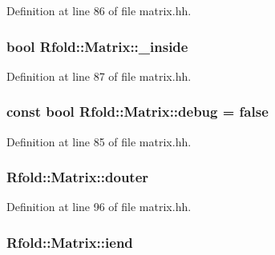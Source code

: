 Definition at line 86 of file matrix.\+hh.

\hypertarget{class_rfold_1_1_matrix_ab5046ea9c3952f87a52002fa583d1e1b}{
\subsubsection[{\+\_\+inside}]{\setlength{\rightskip}{0pt plus 5cm}bool Rfold\+::\+Matrix\+::\+\_\+inside}}\label{class_rfold_1_1_matrix_ab5046ea9c3952f87a52002fa583d1e1b}


Definition at line 87 of file matrix.\+hh.

\hypertarget{class_rfold_1_1_matrix_ad9a9131f0d234138b757dbe76fe62b28}{
\subsubsection[{debug}]{\setlength{\rightskip}{0pt plus 5cm}const bool Rfold\+::\+Matrix\+::debug = false\hspace{0.3cm}{\ttfamily [static]}}}\label{class_rfold_1_1_matrix_ad9a9131f0d234138b757dbe76fe62b28}


Definition at line 85 of file matrix.\+hh.

\hypertarget{class_rfold_1_1_matrix_a95f02edbb0a09ccd75a47f3baf50d1fe}{
\subsubsection[{douter}]{ Rfold\+::\+Matrix\+::douter}}\label{class_rfold_1_1_matrix_a95f02edbb0a09ccd75a47f3baf50d1fe}


Definition at line 96 of file matrix.\+hh.

\hypertarget{class_rfold_1_1_matrix_a2b367dc68757e1459981f18afd9c8ab8}{
\subsubsection[{iend}]{ Rfold\+::\+Matrix\+::iend}}\label{class_rfold_1_1_matrix_a2b367dc68757e1459981f18afd9c8ab8}


